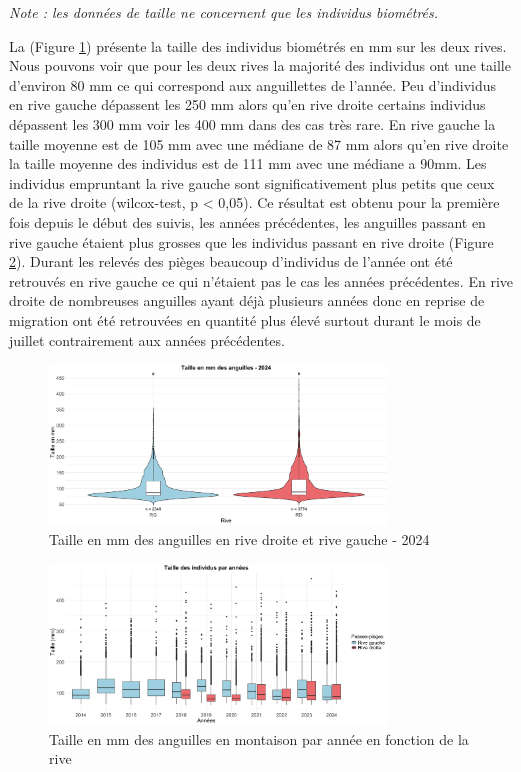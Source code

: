 \documentclass[11pt,titlepage,twoside]{article}\usepackage[]{graphicx}\usepackage[table]{xcolor}
\begin{document}
\textit{Note : les données de taille ne concernent que les individus biométrés. }

La (Figure \ref{taille_oral}) présente la taille des individus biométrés en mm sur les deux rives. Nous pouvons voir que pour les deux rives la majorité des individus ont une taille d’environ 80 mm ce qui correspond aux anguillettes de l’année. Peu d’individus en rive gauche dépassent les 250 mm alors qu’en rive droite certains individus dépassent les 300 mm voir les 400 mm dans des cas très rare. En rive gauche la taille moyenne est de 105 mm avec une médiane de 87 mm alors qu’en rive droite la taille moyenne des individus est de 111 mm avec une médiane a 90mm. Les individus empruntant la rive gauche sont significativement plus petits que ceux de la rive droite (wilcox-test, p < 0,05). Ce résultat est obtenu pour la première fois depuis le début des suivis, les années précédentes, les anguilles passant en rive gauche étaient plus grosses que les individus passant en rive droite (Figure \ref{taille_annee_oral}). Durant les relevés des pièges beaucoup d’individus de l’année ont été retrouvés en rive gauche ce qui n’étaient pas le cas les années précédentes. En rive droite de nombreuses anguilles ayant déjà plusieurs années donc en reprise de migration ont été retrouvées en quantité plus élevé surtout durant le mois de juillet contrairement aux années précédentes. 

\begin{figure}[htpb]
\centering
\includegraphics[width=0.8\textwidth]{taille_oral.png}
\caption{Taille en mm des anguilles en rive droite et rive gauche - 2024}
\label{taille_oral}
\end{figure}

\begin{figure}[htpb]
\centering
\includegraphics[width=0.8\textwidth]{taille_annee_oral.png}
\caption{Taille en mm des anguilles en montaison par année en fonction de la rive}
\label{taille_annee_oral}
\end{figure}
\end{document}
